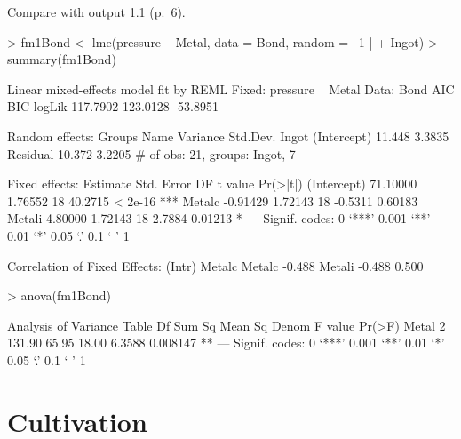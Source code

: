 \documentclass[12pt]{article}
\begin{document}
Compare with output 1.1 (p.~6).
\begin{Schunk}
\begin{Sinput}
> fm1Bond <- lme(pressure ~ Metal, data = Bond, random = ~1 | 
+     Ingot)
> summary(fm1Bond)
\end{Sinput}
\begin{Soutput}
Linear mixed-effects model fit by REML
Fixed: pressure ~ Metal 
 Data: Bond 
      AIC      BIC   logLik
 117.7902 123.0128 -53.8951

Random effects:
 Groups   Name        Variance Std.Dev.
 Ingot    (Intercept) 11.448   3.3835  
 Residual             10.372   3.2205  
# of obs: 21, groups: Ingot, 7

Fixed effects:
            Estimate Std. Error DF t value Pr(>|t|)    
(Intercept) 71.10000    1.76552 18 40.2715  < 2e-16 ***
Metalc      -0.91429    1.72143 18 -0.5311  0.60183    
Metali       4.80000    1.72143 18  2.7884  0.01213 *  
---
Signif. codes:  0 `***' 0.001 `**' 0.01 `*' 0.05 `.' 0.1 ` ' 1 

Correlation of Fixed Effects:
       (Intr) Metalc
Metalc -0.488       
Metali -0.488  0.500
\end{Soutput}
\begin{Sinput}
> anova(fm1Bond)
\end{Sinput}
\begin{Soutput}
Analysis of Variance Table
      Df Sum Sq Mean Sq  Denom F value   Pr(>F)   
Metal  2 131.90   65.95  18.00  6.3588 0.008147 **
---
Signif. codes:  0 `***' 0.001 `**' 0.01 `*' 0.05 `.' 0.1 ` ' 1 
\end{Soutput}
\end{Schunk}

\section{Cultivation}
\label{sec:Cultivation}
\end{document}
